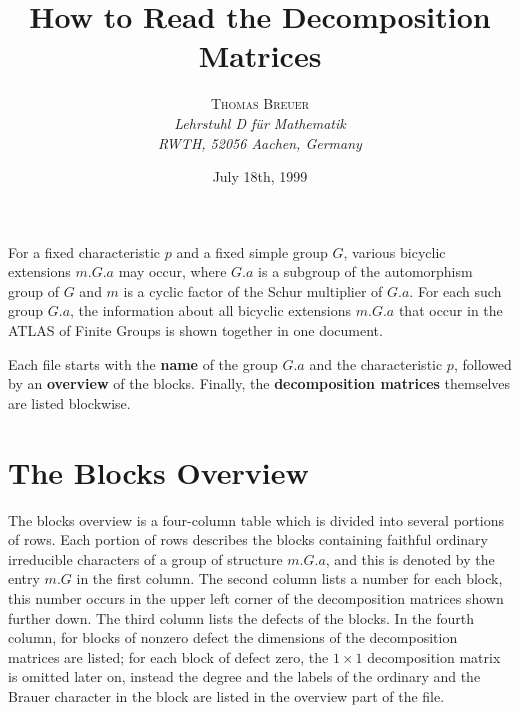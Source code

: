 \documentclass[a4paper]{article}
\def\ATLAS{\textsc{ATLAS}}
\begin{document}
\title{How to Read the Decomposition Matrices}

\author{\textsc{Thomas Breuer} \\[0.5cm]
\textit{Lehrstuhl D f{\"u}r Mathematik} \\
\textit{RWTH, 52056 Aachen, Germany}}

\date{July 18th, 1999}


\maketitle



For a fixed characteristic $p$ and a fixed simple group $G$,
various bicyclic extensions $m.G.a$ may occur,
where $G.a$ is a subgroup of the automorphism group of $G$
and $m$ is a cyclic factor of the Schur multiplier of $G.a$.
For each such group $G.a$, the information about all bicyclic extensions
$m.G.a$ that occur in the {\ATLAS} of Finite Groups is shown together
in one document.


Each file starts with the {\bf name} of the group $G.a$ and the
characteristic $p$,
followed by an {\bf overview} of the blocks.
Finally, the {\bf decomposition matrices} themselves are listed blockwise.


\section{The Blocks Overview}

The blocks overview is a four-column table which is divided into several
portions of rows.
Each portion of rows describes the blocks containing faithful
ordinary irreducible characters of a group of structure $m.G.a$,
and this is denoted by the entry $m.G$ in the first column.
The second column lists a number for each block,
this number occurs in the upper left corner of the decomposition matrices
shown further down.
The third column lists the defects of the blocks.
In the fourth column, for blocks of nonzero defect the dimensions of the
decomposition matrices are listed;
for each block of defect zero, the $1 \times 1$ decomposition matrix
is omitted later on,
instead the degree and the labels of the ordinary and the Brauer
character in the block are listed in the overview part of the file.
\end{document}
